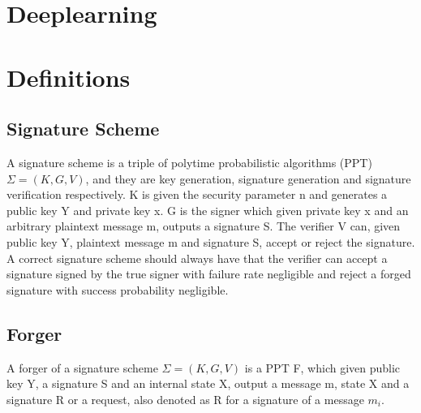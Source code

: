 \documentclass[18]{article}
\begin{document}
\section{Deeplearning}


\section{Definitions}
\subsection{Signature Scheme}
A signature scheme is a triple of polytime probabilistic algorithms (PPT)
$\Sigma=(K,G,V)$, and they are key generation, signature generation and signature verification respectively. K is given the security parameter n
and generates a public key Y and private key x.
G is the signer which given private key x and an arbitrary plaintext message m, outputs a signature S. The verifier V can,
given public key Y, plaintext message m and signature S, accept or reject the signature.
A correct signature scheme should always have that the verifier can accept a signature signed by the true signer with failure rate negligible and reject a forged signature with success probability negligible.
\subsection{Forger}
A forger of a signature scheme $\Sigma=(K,G,V)$ is a PPT F, which given public key Y, a signature S and an internal state X, output a message m, state X and a signature R or a request, also denoted as R for a signature of a message $m_i$. \\
\end{document}
